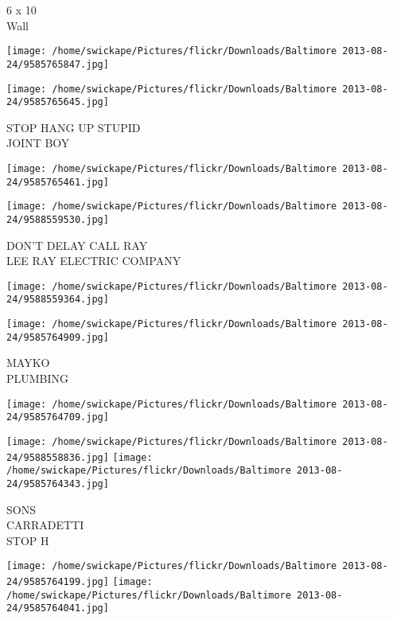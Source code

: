 \documentclass[10pt,letterpaper]{article}
\begin{document}
6 x 10\\
Wall\\
\pagebreak

\texttt{[image: /home/swickape/Pictures/flickr/Downloads/Baltimore 2013-08-24/9585765847.jpg]}

\vspace{0.25in}
\texttt{[image: /home/swickape/Pictures/flickr/Downloads/Baltimore 2013-08-24/9585765645.jpg]}

STOP HANG UP STUPID\\
JOINT BOY\\
\pagebreak

\texttt{[image: /home/swickape/Pictures/flickr/Downloads/Baltimore 2013-08-24/9585765461.jpg]}

\vspace{0.25in}
\texttt{[image: /home/swickape/Pictures/flickr/Downloads/Baltimore 2013-08-24/9588559530.jpg]}

DON'T DELAY CALL RAY\\
LEE RAY ELECTRIC COMPANY\\
\pagebreak

\texttt{[image: /home/swickape/Pictures/flickr/Downloads/Baltimore 2013-08-24/9588559364.jpg]}

\vspace{0.25in}
\texttt{[image: /home/swickape/Pictures/flickr/Downloads/Baltimore 2013-08-24/9585764909.jpg]}

MAYKO\\
PLUMBING\\
\pagebreak

\texttt{[image: /home/swickape/Pictures/flickr/Downloads/Baltimore 2013-08-24/9585764709.jpg]}

\vspace{0.25in}
\texttt{[image: /home/swickape/Pictures/flickr/Downloads/Baltimore 2013-08-24/9588558836.jpg]}
\texttt{[image: /home/swickape/Pictures/flickr/Downloads/Baltimore 2013-08-24/9585764343.jpg]}

SONS\\
CARRADETTI\\
STOP H\\
\pagebreak

\texttt{[image: /home/swickape/Pictures/flickr/Downloads/Baltimore 2013-08-24/9585764199.jpg]}
\texttt{[image: /home/swickape/Pictures/flickr/Downloads/Baltimore 2013-08-24/9585764041.jpg]}
\end{document}
